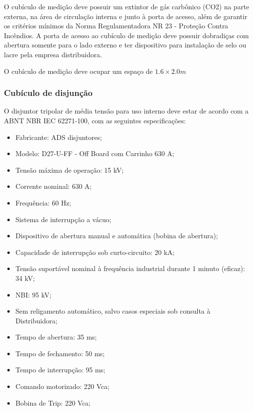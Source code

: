 O cubículo de medição deve possuir um extintor de gás carbônico (CO2) na parte externa, na área de circulação interna e junto à porta de acesso, além de garantir os critérios mínimos da Norma Regulamentadora NR 23 - Proteção Contra Incêndios. A porta de acesso ao cubículo de medição deve possuir dobradiças com abertura somente para o lado externo e ter dispositivo para instalação de selo ou lacre pela empresa distribuidora.

O cubículo de medição deve ocupar um espaço de $1.6 \times 2.0m$

\subsubsection{Cubículo de disjunção}

O disjuntor tripolar de média tensão para uso interno deve estar de acordo com a ABNT NBR IEC 62271-100, com as seguintes especificações:


\begin{itemize}
    \item Fabricante: ADS disjuntores;
    \item Modelo: D27-U-FF - Off Board com Carrinho 630 A;
    \item Tensão máxima de operação: 15 kV;
    \item Corrente nominal: 630 A;
    \item Frequência: 60 Hz;
    \item Sistema de interrupção a vácuo;
    \item Dispositivo de abertura manual e automática (bobina de abertura);
    \item Capacidade de interrupção sob curto-circuito: 20 kA;
    \item Tensão suportável nominal à frequência industrial durante 1 minuto (eficaz): 34 kV;
    \item NBI: 95 kV;
    \item Sem religamento automático, salvo casos especiais sob consulta à Distribuidora;
    \item Tempo de abertura: 35 ms;
    \item Tempo de fechamento: 50 ms;
    \item Tempo de interrupção: 95 ms;
    \item Comando motorizado: 220 Vca;
    \item Bobina de Trip: 220 Vca;
\end{itemize}


